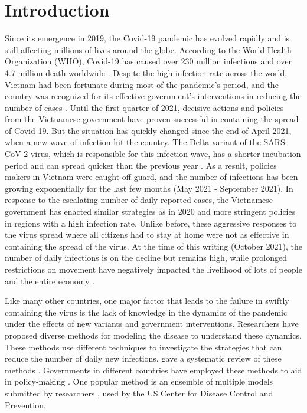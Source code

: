 \chapter{Introduction}
\label{chap:introduction}

Since its emergence in 2019, the Covid-19 pandemic has evolved rapidly and is still affecting millions of lives around the globe.
According to the World Health Organization (WHO), Covid-19 has caused over 230 million infections and over 4.7 million death worldwide \cite{WHOCoronavirusCOVID19}.
Despite the high infection rate across the world, Vietnam had been fortunate during most of the pandemic's period, and the country was recognized for its effective government's interventions in reducing the number of cases \cite{EmergingCOVID19Success,haCombatingCOVID19Epidemic2020}.
Until the first quarter of 2021, decisive actions and policies from the Vietnamese government have proven successful in containing the spread of Covid-19.
But the situation has quickly changed since the end of April 2021, when a new wave of infection hit the country.
The Delta variant of the SARS-CoV-2 virus, which is responsible for this infection wave, has a shorter incubation period and can spread quicker than the previous year \cite{VietnamNewCOVID,mahaseDeltaVariantWhat2021}.
As a result, policies makers in Vietnam were caught off-guard, and the number of infections has been growing exponentially for the last few months (May 2021 - September 2021).
In response to the escalating number of daily reported cases, the Vietnamese government has enacted similar strategies as in 2020 and more stringent policies in regions with a high infection rate.
Unlike before, these aggressive responses to the virus spread where all citizens had to stay at home were not as effective in containing the spread of the virus.
At the time of this writing (October 2021), the number of daily infections is on the decline but remains high, while prolonged restrictions on movement have negatively impacted the livelihood of lots of people and the entire economy \cite{RapidAssessmentDesign, VietnamPoisedMiss}.

Like many other countries, one major factor that leads to the failure in swiftly containing the virus is the lack of knowledge in the dynamics of the pandemic under the effects of new variants and government interventions.
Researchers have proposed diverse methods for modeling the disease to understand these dynamics.
These methods use different techniques to investigate the strategies that can reduce the number of daily new infections.
\citeauthor{rahimiReviewCOVID19Forecasting2021} gave a systematic review of these methods \cite{rahimiReviewCOVID19Forecasting2021}.
Governments in different countries have employed these methods to aid in policy-making \cite{adamSpecialReportSimulations2020}.
One popular method is an ensemble of multiple models submitted by researchers \cite{rayEnsembleForecastsCoronavirus2020}, used by the \gls{US} Center for Disease Control and Prevention.

